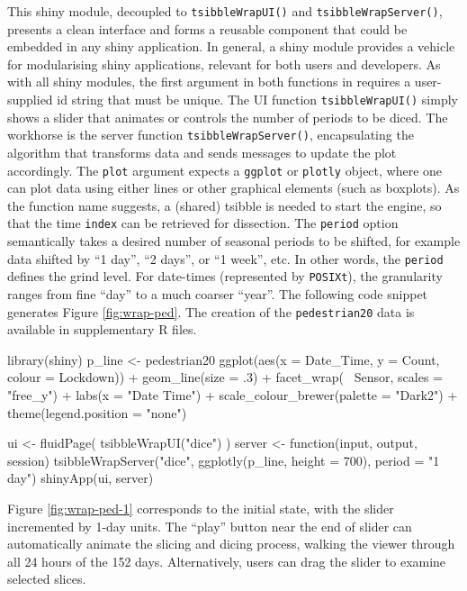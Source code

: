 This shiny module, decoupled to \texttt{tsibbleWrapUI()} and
\texttt{tsibbleWrapServer()}, presents a clean interface and forms a
reusable component that could be embedded in any shiny application. In
general, a shiny module provides a vehicle for modularising shiny
applications, relevant for both users and developers. As with all shiny
modules, the first argument in both functions in 
requires a user-supplied id string that must be unique. The UI function
\texttt{tsibbleWrapUI()} simply shows a slider that animates or controls
the number of periods to be diced. The workhorse is the server function
\texttt{tsibbleWrapServer()}, encapsulating the algorithm that
transforms data and sends messages to update the plot accordingly. The
\texttt{plot} argument expects a \texttt{ggplot} or \texttt{plotly}
object, where one can plot data using either lines or other graphical
elements (such as boxplots). As the function name suggests, a (shared)
tsibble is needed to start the engine, so that the time \texttt{index}
can be retrieved for dissection. The \texttt{period} option semantically
takes a desired number of seasonal periods to be shifted, for example
data shifted by ``1 day'', ``2 days'', or ``1 week'', etc. In other
words, the \texttt{period} defines the grind level. For date-times
(represented by \texttt{POSIXt}), the granularity ranges from fine
``day'' to a much coarser ``year''. The following code snippet generates
Figure \ref{fig:wrap-ped}. The creation of the \texttt{pedestrian20}
data is available in supplementary R files.

\begin{Schunk}
\begin{Sinput}
library(shiny)
p_line <- pedestrian20 %
  ggplot(aes(x = Date_Time, y = Count, colour = Lockdown)) +
  geom_line(size = .3) +
  facet_wrap(~ Sensor, scales = "free_y") +
  labs(x = "Date Time") +
  scale_colour_brewer(palette = "Dark2") +
  theme(legend.position = "none")

ui <- fluidPage(
  tsibbleWrapUI("dice")
)
server <- function(input, output, session) {
  tsibbleWrapServer("dice", ggplotly(p_line, height = 700), period = "1 day")
}
shinyApp(ui, server)
\end{Sinput}
\end{Schunk}

Figure \ref{fig:wrap-ped-1} corresponds to the initial state, with the
slider incremented by 1-day units. The ``play'' button near the end of
slider can automatically animate the slicing and dicing process, walking
the viewer through all 24 hours of the 152 days. Alternatively, users
can drag the slider to examine selected slices.

